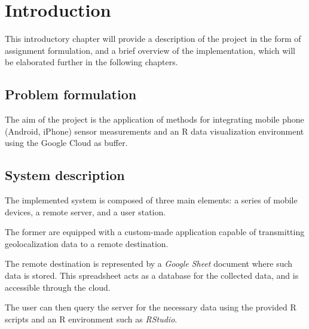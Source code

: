 \chapter{Introduction}
This introductory chapter will provide a description of the project in the form of assignment formulation, and a brief overview of the implementation, which will be elaborated further in the following chapters.

\section{Problem formulation}
The aim of the project is the application of methods for integrating mobile phone (Android, iPhone) sensor measurements and an R data visualization environment using the Google Cloud as buffer.

\section{System description}
The implemented system is composed of three main elements: a series of mobile devices, a remote server, and a user station.

The former are equipped with a custom-made application capable of transmitting geolocalization data to a remote destination.

The remote destination is represented by a \emph{Google Sheet} document where such data is stored.
This spreadsheet acts as a database for the collected data, and is accessible through the cloud.

The user can then query the server for the necessary data using the provided R scripts and an R environment such as \emph{RStudio}.

